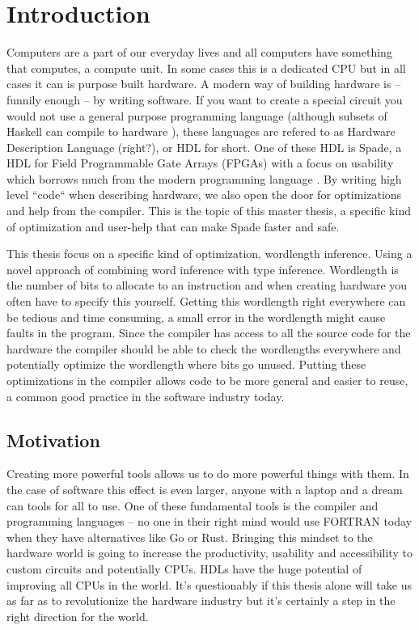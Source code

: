 \documentclass[msc,lith,english]{liuthesis}
\author{Edvard Thörnros}
\begin{document}
\chapter{Introduction}
\label{chaIntro}
Computers are a part of our everyday lives and all computers have something that computes, a compute unit. In some cases this is a dedicated CPU but in all cases it can is purpose built hardware. A modern way of building hardware is -- funnily enough -- by writing software. If you want to create a special circuit you would not use a general purpose programming language (although subsets of Haskell can compile to hardware \cite{src:ClashExists}), these languages are refered to as Hardware Description Language (right?), or HDL for short. One of these HDL is Spade, a HDL for Field Programmable Gate Arrays (FPGAs) with a focus on usability which borrows much from the modern programming language \cite{src:spadeSomething} \cite{src:spadeAnHDL}. By writing high level ``code`` when describing hardware, we also open the door for optimizations and help from the compiler. This is the topic of this master thesis, a specific kind of optimization and user-help that can make Spade faster and safe.

This thesis focus on a specific kind of optimization, wordlength inference. Using a novel approach of combining word inference with type inference. Wordlength is the number of bits to allocate to an instruction and when creating hardware you often have to specify this yourself. Getting this wordlength right everywhere can be tedious and time consuming, a small error in the wordlength might cause faults in the program. %
Since the compiler has access to all the source code for the hardware the compiler should be able to check the wordlengths everywhere and potentially optimize the wordlength where bits go unused. Putting these optimizations in the compiler allows code to be more general and easier to reuse, a common good practice in the software industry today. 

\section{Motivation}
Creating more powerful tools allows us to do more powerful things with them. In the case of software this effect is even larger, anyone with a laptop and a dream can tools for all to use. One of these fundamental tools is the compiler and programming languages -- no one in their right mind would use FORTRAN today when they have alternatives like Go or Rust. Bringing this mindset to the hardware world is going to increase the productivity, usability and accessibility to custom circuits and potentially CPUs. HDLs have the huge potential of improving all CPUs in the world. It's questionably if this thesis alone will take us as far as to revolutionize the hardware industry but it's certainly a step in the right direction for the world.
\end{document}
